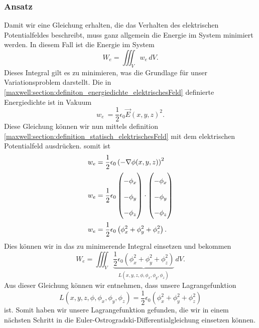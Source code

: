 \subsubsection{Ansatz}
Damit wir eine Gleichung erhalten, die das Verhalten des elektrischen Potentialfeldes beschreibt, muss ganz allgemein die Energie im System minimiert werden. 
In diesem Fall ist die Energie im System
\[
W_e
=
\iiint_V w_e\, dV.
\]
Dieses Integral gilt es zu minimieren, was die Grundlage für unser Variationsproblem darstellt.
Die in \eqref{maxwell:section:definiton_energiedichte_elektrischesFeld} definierte Energiedichte ist in Vakuum
\[
w_e\
=
\frac{1}{2}\epsilon_0\vec{E}(x,y,z)^2.
\]
Diese Gleichung können wir nun mittels definition \eqref{maxwell:section:definition_statisch_elektrischesFeld} mit dem elektrischen Potentialfeld ausdrücken.
somit ist
\begin{align}
\renewcommand{\arraystretch}{1.9}
w_e
&=
\frac{1}{2}\epsilon_0\left(-\nabla\phi(x,y,z)\right)^2
\\
w_e
&=
\frac{1}{2}\epsilon_0
\begin{pmatrix}
\displaystyle
-\phi_x\\
\displaystyle
-\phi_y\\
\displaystyle
-\phi_z
\end{pmatrix}
\cdot
\begin{pmatrix}
\displaystyle
-\phi_x\\
\displaystyle
-\phi_y\\
\displaystyle
-\phi_z
\end{pmatrix}
\\
w_e
&=
\frac{1}{2}\epsilon_0\left(\phi_x^2 + \phi_y^2 + \phi_z^2\right).
\label{maxwell:section:energiedichte}
\end{align}
Dies können wir in das zu minimerende Integral einsetzen und bekommen
\begin{equation}
	W_e
	=
	\iiint_V \underbrace{
		\frac{1}{2}\epsilon_0\left(\phi_x^2 + \phi_y^2 + \phi_z^2\right)}_{L(x,y,z,\phi,\phi_x,\phi_y,\phi_z)}\, dV.
	\label{maxwell:section:energieintegral_quellenfrei}
\end{equation}
Aus dieser Gleichung können wir entnehmen, dass unsere Lagrangefunktion
\begin{equation}
	L(x,y,z,\phi,\phi_x,\phi_y,\phi_z)
	=
	\frac{1}{2}\epsilon_0\left(\phi_x^2 + \phi_y^2 + \phi_z^2\right)
	\label{maxwell:section:lagrangefunktion_quellenfrei}
\end{equation}
ist.
Somit haben wir unsere Lagrangefunktion gefunden, die wir in einem nächsten Schritt in die Euler-Ostrogradski-Differentialgleichung einsetzen können.

